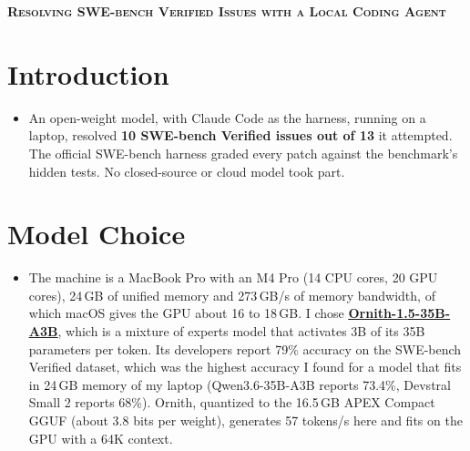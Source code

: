 \documentclass[letterpaper,11pt]{article}
\newcommand{\resumeItem}[1]{
  \item\small{
    {#1 \vspace{-2pt}}
  }
}
\newcommand{\resumeItemListStart}{\begin{itemize}[leftmargin=0.15in, label={}]}
\newcommand{\resumeItemListEnd}{\end{itemize}\vspace{-5pt}}
\begin{document}
\begin{center}
    \textbf{\Large \scshape Resolving SWE-bench Verified Issues with a Local Coding Agent}
\end{center}

\section{Introduction}
 \resumeItemListStart
    \resumeItem{An open-weight model, with Claude Code as the harness, running on a laptop, resolved \textbf{10 SWE-bench Verified issues out of 13} it attempted. The official SWE-bench harness graded every patch against the benchmark's hidden tests. No closed-source or cloud model took part.}
 \resumeItemListEnd

\section{Model Choice}
 \resumeItemListStart
    \resumeItem{The machine is a MacBook Pro with an M4 Pro (14 CPU cores, 20 GPU cores), 24\,GB of unified memory and 273\,GB/s of memory bandwidth, of which macOS gives the GPU about 16 to 18\,GB. I chose \href{https://huggingface.co/ornith-ai/Ornith-1.5-35B-A3B}{\textbf{\underline{Ornith-1.5-35B-A3B}}}, which is a mixture of experts model that activates 3B of its 35B parameters per token. Its developers report 79\% accuracy on the SWE-bench Verified dataset, which was the highest accuracy I found for a model that fits in 24\,GB memory of my laptop (Qwen3.6-35B-A3B reports 73.4\%, Devstral Small 2 reports 68\%). Ornith, quantized to the 16.5\,GB APEX Compact GGUF (about 3.8 bits per weight), generates 57 tokens/s here and fits on the GPU with a 64K context.}
 \resumeItemListEnd

\end{document}
